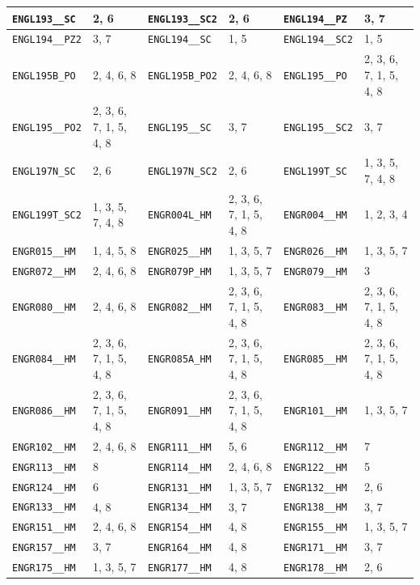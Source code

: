 \begin{longtable}{|l|l||l|l||l|l|}
    \verb|ENGL193__SC| & 2, 6 & \verb|ENGL193__SC2| & 2, 6 & \verb|ENGL194__PZ| & 3, 7\\\hline
    \verb|ENGL194__PZ2| & 3, 7 & \verb|ENGL194__SC| & 1, 5 & \verb|ENGL194__SC2| & 1, 5\\\hline
    \verb|ENGL195B_PO| & 2, 4, 6, 8 & \verb|ENGL195B_PO2| & 2, 4, 6, 8 & \verb|ENGL195__PO| & 2, 3, 6, 7, 1, 5, 4, 8\\\hline
    \verb|ENGL195__PO2| & 2, 3, 6, 7, 1, 5, 4, 8 & \verb|ENGL195__SC| & 3, 7 & \verb|ENGL195__SC2| & 3, 7\\\hline
    \verb|ENGL197N_SC| & 2, 6 & \verb|ENGL197N_SC2| & 2, 6 & \verb|ENGL199T_SC| & 1, 3, 5, 7, 4, 8\\\hline
    \verb|ENGL199T_SC2| & 1, 3, 5, 7, 4, 8 & \verb|ENGR004L_HM| & 2, 3, 6, 7, 1, 5, 4, 8 & \verb|ENGR004__HM| & 1, 2, 3, 4\\\hline
    \verb|ENGR015__HM| & 1, 4, 5, 8 & \verb|ENGR025__HM| & 1, 3, 5, 7 & \verb|ENGR026__HM| & 1, 3, 5, 7\\\hline
    \verb|ENGR072__HM| & 2, 4, 6, 8 & \verb|ENGR079P_HM| & 1, 3, 5, 7 & \verb|ENGR079__HM| & 3\\\hline
    \verb|ENGR080__HM| & 2, 4, 6, 8 & \verb|ENGR082__HM| & 2, 3, 6, 7, 1, 5, 4, 8 & \verb|ENGR083__HM| & 2, 3, 6, 7, 1, 5, 4, 8\\\hline
    \verb|ENGR084__HM| & 2, 3, 6, 7, 1, 5, 4, 8 & \verb|ENGR085A_HM| & 2, 3, 6, 7, 1, 5, 4, 8 & \verb|ENGR085__HM| & 2, 3, 6, 7, 1, 5, 4, 8\\\hline
    \verb|ENGR086__HM| & 2, 3, 6, 7, 1, 5, 4, 8 & \verb|ENGR091__HM| & 2, 3, 6, 7, 1, 5, 4, 8 & \verb|ENGR101__HM| & 1, 3, 5, 7\\\hline
    \verb|ENGR102__HM| & 2, 4, 6, 8 & \verb|ENGR111__HM| & 5, 6 & \verb|ENGR112__HM| & 7\\\hline
    \verb|ENGR113__HM| & 8 & \verb|ENGR114__HM| & 2, 4, 6, 8 & \verb|ENGR122__HM| & 5\\\hline
    \verb|ENGR124__HM| & 6 & \verb|ENGR131__HM| & 1, 3, 5, 7 & \verb|ENGR132__HM| & 2, 6\\\hline
    \verb|ENGR133__HM| & 4, 8 & \verb|ENGR134__HM| & 3, 7 & \verb|ENGR138__HM| & 3, 7\\\hline
    \verb|ENGR151__HM| & 2, 4, 6, 8 & \verb|ENGR154__HM| & 4, 8 & \verb|ENGR155__HM| & 1, 3, 5, 7\\\hline
    \verb|ENGR157__HM| & 3, 7 & \verb|ENGR164__HM| & 4, 8 & \verb|ENGR171__HM| & 3, 7\\\hline
    \verb|ENGR175__HM| & 1, 3, 5, 7 & \verb|ENGR177__HM| & 4, 8 & \verb|ENGR178__HM| & 2, 6\\\hline

\end{longtable}
